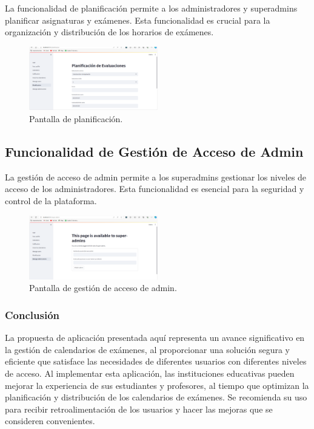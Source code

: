 \documentclass{article}
\begin{document}
La funcionalidad de planificación permite a los administradores y superadmins planificar asignaturas y exámenes. Esta funcionalidad es crucial para la organización y distribución de los horarios de exámenes.

\begin{figure}[h!] \centering \includegraphics[width=0.5\textwidth]{planificacion.png} \caption{Pantalla de planificación.} \end{figure}

\subsection{Funcionalidad de Gestión de Acceso de Admin}

La gestión de acceso de admin permite a los superadmins gestionar los niveles de acceso de los administradores. Esta funcionalidad es esencial para la seguridad y control de la plataforma.

\begin{figure}[h!] \centering \includegraphics[width=0.5\textwidth]{gestion_acceso_admin.png} \caption{Pantalla de gestión de acceso de admin.} \end{figure} 
\subsubsection{Conclusión}

La propuesta de aplicación presentada aquí representa un avance significativo en la gestión de calendarios de exámenes, al proporcionar una solución segura y eficiente que satisface las necesidades de diferentes usuarios con diferentes niveles de acceso. Al implementar esta aplicación, las instituciones educativas pueden mejorar la experiencia de sus estudiantes y profesores, al tiempo que optimizan la planificación y distribución de los calendarios de exámenes. Se recomienda su uso para recibir retroalimentación de los usuarios y hacer las mejoras que se consideren convenientes.
\end{document}
